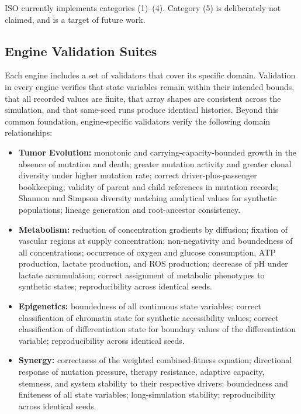 \documentclass[12pt,a4paper]{article}
\begin{document}
ISO currently implements categories (1)--(4). Category (5) is deliberately not claimed, and is a target of future work.

\subsection{Engine Validation Suites}

Each engine includes a set of validators that cover its specific domain. Validation in every engine verifies that state variables remain within their intended bounds, that all recorded values are finite, that array shapes are consistent across the simulation, and that same-seed runs produce identical histories. Beyond this common foundation, engine-specific validators verify the following domain relationships:

\begin{itemize}[leftmargin=*]
    \item \textbf{Tumor Evolution:} monotonic and carrying-capacity-bounded growth in the absence of mutation and death; greater mutation activity and greater clonal diversity under higher mutation rate; correct driver-plus-passenger bookkeeping; validity of parent and child references in mutation records; Shannon and Simpson diversity matching analytical values for synthetic populations; lineage generation and root-ancestor consistency.
    \item \textbf{Metabolism:} reduction of concentration gradients by diffusion; fixation of vascular regions at supply concentration; non-negativity and boundedness of all concentrations; occurrence of oxygen and glucose consumption, ATP production, lactate production, and ROS production; decrease of pH under lactate accumulation; correct assignment of metabolic phenotypes to synthetic states; reproducibility across identical seeds.
    \item \textbf{Epigenetics:} boundedness of all continuous state variables; correct classification of chromatin state for synthetic accessibility values; correct classification of differentiation state for boundary values of the differentiation variable; reproducibility across identical seeds.
    \item \textbf{Synergy:} correctness of the weighted combined-fitness equation; directional response of mutation pressure, therapy resistance, adaptive capacity, stemness, and system stability to their respective drivers; boundedness and finiteness of all state variables; long-simulation stability; reproducibility across identical seeds.
\end{itemize}
\end{document}
